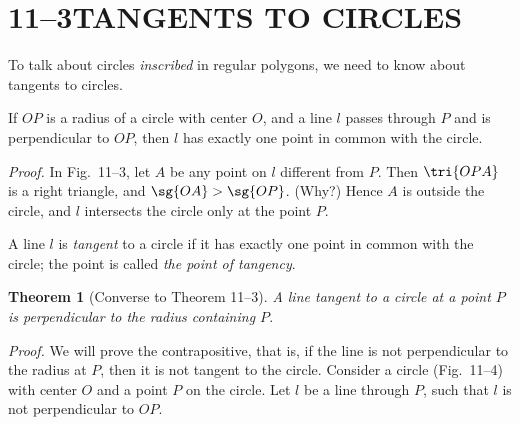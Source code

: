 \documentclass[11pt]{book}
\theoremstyle{bkplain}
\theoremstyle{XIplainnote}
\newtheorem{XIthmnote}[theorem]{Theorem}
\theoremstyle{bkplain}
\theoremstyle{bkplain}
\begin{document}
\section*{11--3\quad TANGENTS TO CIRCLES}

To talk about circles \emph{inscribed} in regular polygons, we need to know
about tangents to circles.

\begin{theorem}
If $OP$ is a radius of a circle with center $O$, and a line $l$ passes through
$P$ and is perpendicular to $OP$, then $l$ has exactly one point in common with
the circle.
\end{theorem}

\noindent\emph{Proof.} In Fig.~11--3, let $A$ be any point on $l$ different
from $P$. Then $\tri{OPA}$ is a right triangle, and $\sg{OA} > \sg{OP}$.
(Why?) Hence $A$ is outside the circle, and $l$ intersects the circle only at
the point $P$.

\begin{definition}
A line $l$ is \emph{tangent} to a circle if it has exactly one point in common
with the circle; the point is called \emph{the point of tangency}.
\end{definition}

\FIGXITHREEFOUR

\begin{XIthmnote}[Converse to Theorem 11--3]
A line tangent to a circle at a point $P$ is perpendicular to the radius
containing $P$.
\end{XIthmnote}

\noindent\emph{Proof.} We will prove the contrapositive, that is, if the line
is not perpendicular to the radius at $P$, then it is not tangent to the
circle. Consider a circle (Fig.~11--4) with center $O$ and a point $P$ on the
circle. Let $l$ be a line through $P$, such that $l$ is not perpendicular to
$OP$.

\begin{steps}
\end{steps}
\end{document}
